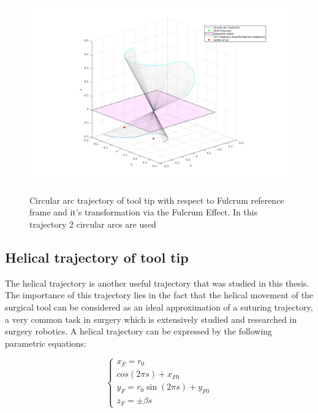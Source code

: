 \begin{center}
\begin{figure}[!htb]
\centering
\includegraphics[width=\textwidth]{images/rcm_trajectories/rcm_arcs_traj.png}\\
\caption{Circular arc trajectory of tool tip with respect to Fulcrum reference frame and it's transformation via the Fulcrum Effect. In this trajectory 2 circular arcs are used}
\end{figure}
\end{center}

\subsection{Helical trajectory of tool tip}

The helical trajectory is another useful trajectory that was studied in this thesis. The importance of this trajectory lies in the fact that the helical movement of the surgical tool can be considered as an ideal 
approximation of a suturing trajectory, a very common task in surgery which is extensively studied and researched in surgery robotics. A helical trajectory can be expressed by the following parametric equations:

\begin{equation}
\begin{cases}
x^{}_{F} = r_0\\cos(2πs) + x^{}_{F0} \\
y^{}_{F} = r_0\sin(2πs) + y^{}_{F0} \\
z^{}_{F} = \pm βs
\end{cases}
\end{equation}


